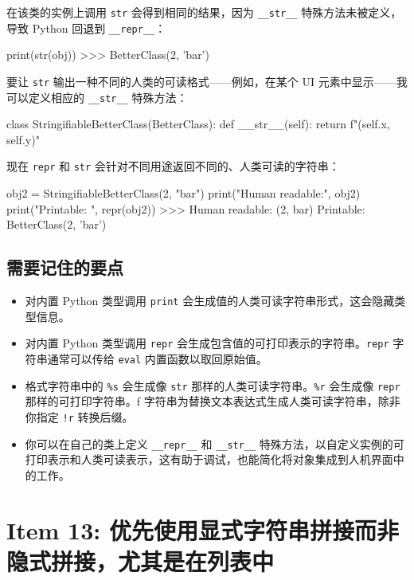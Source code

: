 在该类的实例上调用 \texttt{str} 会得到相同的结果，因为 \texttt{\_\_str\_\_} 特殊方法未被定义，导致 Python 回退到 \texttt{\_\_repr\_\_}：

\begin{codebox}[python]
print(str(obj))
>>>
BetterClass(2, 'bar')
\end{codebox}

要让 \texttt{str} 输出一种不同的人类的可读格式——例如，在某个 UI 元素中显示——我可以定义相应的 \texttt{\_\_str\_\_} 特殊方法：

\begin{codebox}[python]
class StringifiableBetterClass(BetterClass):
    def __str__(self):
        return f"({self.x}, {self.y})"
\end{codebox}

现在 \texttt{repr} 和 \texttt{str} 会针对不同用途返回不同的、人类可读的字符串：

\begin{codebox}[python]
obj2 = StringifiableBetterClass(2, "bar")
print("Human readable:", obj2)
print("Printable:     ", repr(obj2))
>>>
Human readable: (2, bar)
Printable:      BetterClass(2, 'bar')
\end{codebox}

\subsection{需要记住的要点}

\begin{itemize}
\item 对内置 Python 类型调用 \texttt{print} 会生成值的人类可读字符串形式，这会隐藏类型信息。
\item 对内置 Python 类型调用 \texttt{repr} 会生成包含值的可打印表示的字符串。\texttt{repr} 字符串通常可以传给 \texttt{eval} 内置函数以取回原始值。
\item 格式字符串中的 \texttt{\%s} 会生成像 \texttt{str} 那样的人类可读字符串。\texttt{\%r} 会生成像 \texttt{repr} 那样的可打印字符串。f 字符串为替换文本表达式生成人类可读字符串，除非你指定 \texttt{!r} 转换后缀。
\item 你可以在自己的类上定义 \texttt{\_\_repr\_\_} 和 \texttt{\_\_str\_\_} 特殊方法，以自定义实例的可打印表示和人类可读表示，这有助于调试，也能简化将对象集成到人机界面中的工作。
\end{itemize}

\section{Item 13: 优先使用显式字符串拼接而非隐式拼接，尤其是在列表中}

